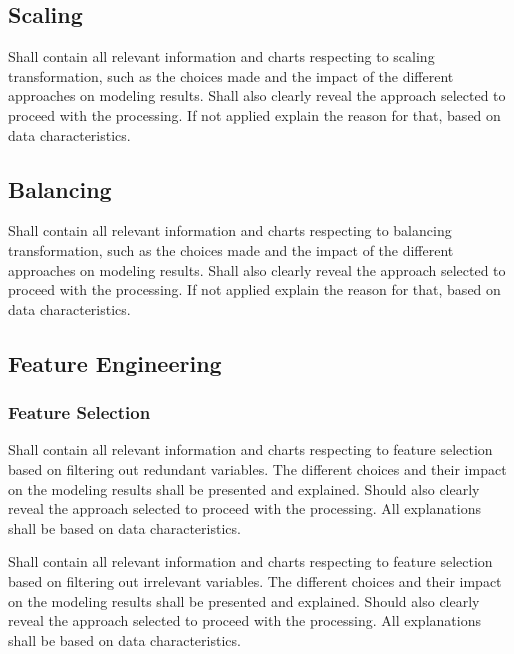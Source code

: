 \documentclass[11pt]{article}
\begin{document}



\subsection*{Scaling}
\begin{tcolorbox} %
Shall contain all relevant information and charts respecting to scaling transformation, such as the choices made and the impact of the different approaches on modeling results. Shall also clearly reveal the approach selected to proceed with the processing. 
If not applied explain the reason for that, based on data characteristics.
\end{tcolorbox} %


\subsection*{Balancing}
\begin{tcolorbox} %
Shall contain all relevant information and charts respecting to balancing transformation, such as the choices made and the impact of the different approaches on modeling results. Shall also clearly reveal the approach selected to proceed with the processing. 
If not applied explain the reason for that, based on data characteristics.
\end{tcolorbox} %


\subsection{Feature Engineering}
\subsubsection*{Feature Selection}
\begin{tcolorbox} %
Shall contain all relevant information and charts respecting to feature selection based on filtering out redundant variables. The different choices and their impact on the modeling results shall be presented and explained. Should also clearly reveal the approach selected to proceed with the processing. 
All explanations shall be based on data characteristics.
\end{tcolorbox} %
\begin{tcolorbox} %
Shall contain all relevant information and charts respecting to feature selection based on filtering out irrelevant variables. The different choices and their impact on the modeling results shall be presented and explained. Should also clearly reveal the approach selected to proceed with the processing. 
All explanations shall be based on data characteristics.
\end{tcolorbox} %
\end{document}
